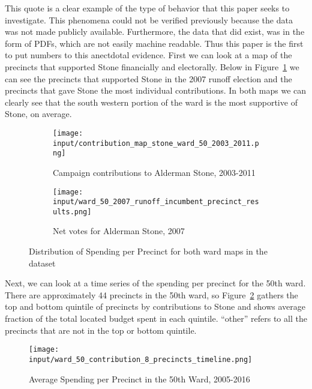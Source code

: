 This quote is a clear example of the type of behavior that this paper seeks to investigate.
This phenomena could not be verified previously because the data was not made publicly available. 
Furthermore, the data that did exist, was in the form of PDFs, which are not easily machine readable.
Thus this paper is the first to put numbers to this anectdotal evidence.
First we can look at a map of the precincts that supported Stone financially and electorally.
Below in Figure~\ref{fig:stone_support_maps} we can see the precincts that supported Stone in the 2007 runoff election and the precincts that gave Stone the most individual contributions.
In both maps we can clearly see that the south western portion of the ward is the most supportive of Stone, on average.
\begin{figure}[H]
    \centering
    \begin{subfigure}[b]{0.45\textwidth} %
    \texttt{[image: input/contribution\_map\_stone\_ward\_50\_2003\_2011.png]}
    \caption{Campaign contributions to Alderman Stone, 2003-2011}
    \end{subfigure}
    \hfill %
    \begin{subfigure}[b]{0.45\textwidth}
    \texttt{[image: input/ward\_50\_2007\_runoff\_incumbent\_precinct\_results.png]}
    \caption{Net votes for Alderman Stone, 2007}
    \end{subfigure}
    \caption{Distribution of Spending per Precinct for both ward maps in the dataset}
    \label{fig:stone_support_maps}
\end{figure}

Next, we can look at a time series of the spending per precinct for the 50th ward. 
There are approximately 44 precincts in the 50th ward, so Figure~\ref{fig:stone_spending_timeline} gathers the top and bottom quintile of precincts by contributions to Stone and shows average fraction of the total located budget spent in each quintile. 
``other'' refers to all the precincts that are not in the top or bottom quintile.

\begin{figure}[H]
    \centering
    \texttt{[image: input/ward\_50\_contribution\_8\_precincts\_timeline.png]}
    \caption{Average Spending per Precinct in the 50th Ward, 2005-2016}
    \label{fig:stone_spending_timeline}
\end{figure}

